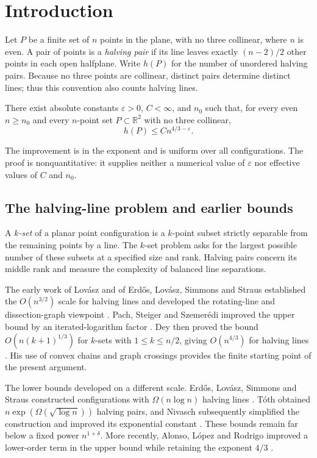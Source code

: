 \section{Introduction}\label{sec:introduction}
Let $P$ be a finite set of $n$ points in the plane, with no three
collinear, where $n$ is even. A pair of points is a \emph{halving pair}
if its line leaves exactly $(n-2)/2$ other points in each open halfplane.
Write $h(P)$ for the number of unordered halving pairs. Because no three
points are collinear, distinct pairs determine distinct lines; thus this
convention also counts halving lines.

\begin{theorem}\label{thm:halving-power}
There exist absolute constants $\varepsilon>0$, $C<\infty$, and $n_0$
such that, for every even $n\ge n_0$ and every $n$-point set
$P\subset\mathbb R^2$ with no three collinear,
\[
 h(P)\le C n^{4/3-\varepsilon}.
\]
\end{theorem}

The improvement is in the exponent and is uniform over all configurations.
The proof is nonquantitative: it supplies neither a numerical value of
$\varepsilon$ nor effective values of $C$ and $n_0$.

\subsection{The halving-line problem and earlier bounds}
A \emph{$k$-set} of a planar point configuration is a $k$-point subset
strictly separable from the remaining points by a line. The $k$-set
problem asks for the largest possible number of these subsets at a
specified size and rank. Halving pairs concern its middle rank and
measure the complexity of balanced line separations.

The early work of Lov\'asz and of Erd\H{o}s, Lov\'asz, Simmons and
Straus established the $O(n^{3/2})$ scale for halving lines and developed
the rotating-line and dissection-graph viewpoint
\cite{Lovasz1971,ErdosLovaszSimmonsStraus1973}.
Pach, Steiger and Szemer\'edi improved the upper bound by an
iterated-logarithm factor \cite{PachSteigerSzemeredi1992}.
Dey then proved the bound $O(n(k+1)^{1/3})$ for $k$-sets with
$1\le k\le n/2$, giving $O(n^{4/3})$ for halving lines
\cite{Dey1998}. His use of convex chains and graph crossings provides
the finite starting point of the present argument.

The lower bounds developed on a different scale.
Erd\H{o}s, Lov\'asz, Simmons and Straus constructed configurations with
$\Omega(n\log n)$ halving lines
\cite{ErdosLovaszSimmonsStraus1973}. T{\'o}th obtained
$n\exp(\Omega(\sqrt{\log n}))$ halving pairs, and Nivasch subsequently
simplified the construction and improved its exponential constant
\cite{Toth2001,Nivasch2008}. These bounds remain far below a fixed
power $n^{1+\delta}$. More recently, Alonso, L{\'o}pez and Rodrigo
improved a lower-order term in the upper bound while retaining the
exponent $4/3$ \cite{AlonsoLopezRodrigo2024}.

